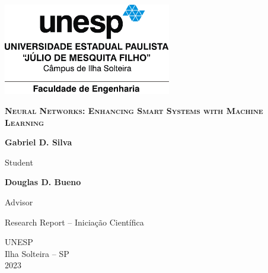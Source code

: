 \begin{titlepage}
    
\centering
\includegraphics[width=0.55\textwidth]{figures/logos/unesp-acessorio.pdf}



\vfill

{\LARGE\bfseries\scshape Neural Networks: Enhancing Smart Systems with Machine Learning}



\vfill

\textbf{Gabriel D. Silva}

Student

\textbf{Douglas D. Bueno}

Advisor

\hspace{1cm}

Research Report -- Iniciação Científica 

\vfill

UNESP \\
Ilha Solteira -- SP \\
2023
\end{titlepage}


     
     
     
     
     
     
     
      

